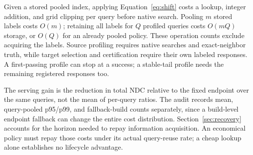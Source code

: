 Given a stored pooled index, applying Equation~\eqref{eq:shift} costs a lookup, integer addition, and grid clipping per query before native search. Pooling $m$ stored labels costs $O(m)$; retaining all labels for $Q$ profiled queries costs $O(mQ)$ storage, or $O(Q)$ for an already pooled policy. These operation counts exclude acquiring the labels. Source profiling requires native searches and exact-neighbor truth, while target selection and certification require their own labeled responses. A first-passing profile can stop at a success; a stable-tail profile needs the remaining registered responses too.

The serving gain is the reduction in total NDC relative to the fixed endpoint over the same queries, not the mean of per-query ratios. The audit records mean, query-pooled p95/p99, and fallback-build counts separately, since a build-level endpoint fallback can change the entire cost distribution. Section~\ref{sec:recovery} accounts for the horizon needed to repay information acquisition. An economical policy must repay those costs under its actual query-reuse rate; a cheap lookup alone establishes no lifecycle advantage.
